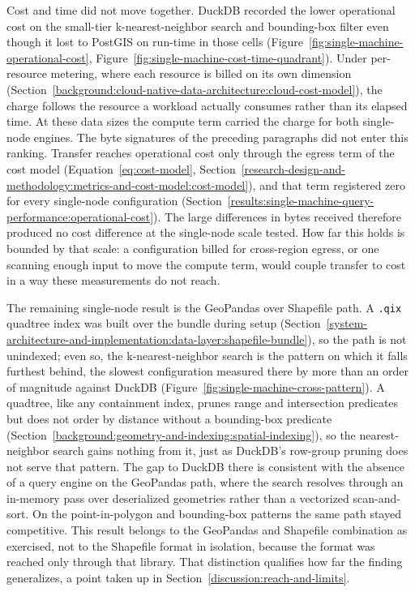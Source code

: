 Cost and time did not move together. DuckDB recorded the lower operational cost on the small-tier k-nearest-neighbor search and bounding-box filter even though it lost to PostGIS on run-time in those cells (Figure~\ref{fig:single-machine-operational-cost}, Figure~\ref{fig:single-machine-cost-time-quadrant}). Under per-resource metering, where each resource is billed on its own dimension \parencite{mell2011_nist_definition_of_cloud_computing} (Section~\ref{background:cloud-native-data-architecture:cloud-cost-model}), the charge follows the resource a workload actually consumes rather than its elapsed time. At these data sizes the compute term carried the charge for both single-node engines. The byte signatures of the preceding paragraphs did not enter this ranking. Transfer reaches operational cost only through the egress term of the cost model (Equation~\ref{eq:cost-model}, Section~\ref{research-design-and-methodology:metrics-and-cost-model:cost-model}), and that term registered zero for every single-node configuration (Section~\ref{results:single-machine-query-performance:operational-cost}). The large differences in bytes received therefore produced no cost difference at the single-node scale tested. How far this holds is bounded by that scale: a configuration billed for cross-region egress, or one scanning enough input to move the compute term, would couple transfer to cost in a way these measurements do not reach.

The remaining single-node result is the GeoPandas over Shapefile path. A \texttt{.qix} quadtree index was built over the bundle during setup (Section~\ref{system-architecture-and-implementation:data-layer:shapefile-bundle}), so the path is not unindexed; even so, the k-nearest-neighbor search is the pattern on which it falls furthest behind, the slowest configuration measured there by more than an order of magnitude against DuckDB (Figure~\ref{fig:single-machine-cross-pattern}). A quadtree, like any containment index, prunes range and intersection predicates but does not order by distance without a bounding-box predicate \parencite{guttman1984_rtree_dynamic_index} (Section~\ref{background:geometry-and-indexing:spatial-indexing}), so the nearest-neighbor search gains nothing from it, just as DuckDB's row-group pruning does not serve that pattern. The gap to DuckDB there is consistent with the absence of a query engine on the GeoPandas path, where the search resolves through an in-memory pass over deserialized geometries rather than a vectorized scan-and-sort. On the point-in-polygon and bounding-box patterns the same path stayed competitive. This result belongs to the GeoPandas and Shapefile combination as exercised, not to the Shapefile format in isolation, because the format was reached only through that library. That distinction qualifies how far the finding generalizes, a point taken up in Section~\ref{discussion:reach-and-limits}.